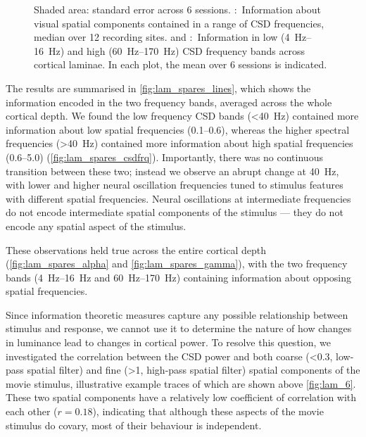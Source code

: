 \begin{figure}[htbp]
{Shaded area: standard error across \num{6} sessions.
\protect{}:~Information about visual spatial components contained in a range of \ac{CSD} frequencies, median over \num{12} recording sites.
\protect{} and \protect{}:~Information in low (\SIrange{4}{16}{Hz}) and high (\SIrange{60}{170}{Hz}) \ac{CSD} frequency bands across cortical laminae.
In each plot, the mean over \num{6} sessions is indicated.
}%
\label{fig:lam_spares}
%
\end{figure}

The results are summarised in \autoref{fig:lam_spares_lines}, which shows the information encoded in the two frequency bands, averaged across the whole cortical depth.
We found the low frequency \ac{CSD} bands (\SI{<40}{Hz}) contained more information about low spatial frequencies (\SIrange{0.1}{0.6}{\cpd}), whereas the higher spectral frequencies (\SI{>40}{Hz}) contained more information about high spatial frequencies (\SIrange{0.6}{5.0}{\cpd}) (\autoref{fig:lam_spares_csdfrq}).
Importantly, there was no continuous transition between these two; instead we observe an abrupt change at \SI{40}{Hz}, with lower and higher neural oscillation frequencies tuned to stimulus features with different spatial frequencies.
Neural oscillations at intermediate frequencies do not encode intermediate spatial components of the stimulus --- they do not encode any spatial aspect of the stimulus.

These observations held true across the entire cortical depth (\autoref{fig:lam_spares_alpha} and \autoref{fig:lam_spares_gamma}), with the two frequency bands (\SIrange{4}{16}{Hz} and \SIrange{60}{170}{Hz}) containing information about opposing spatial frequencies.

Since information theoretic measures capture any possible relationship between stimulus and response, we cannot use it to determine the nature of how changes in luminance lead to changes in cortical power.
To resolve this question, we investigated the correlation between the \ac{CSD} power and both coarse (\SI{<0.3}{\cpd}, low-pass spatial filter) and fine (\SI{>1}{\cpd}, high-pass spatial filter) spatial components of the movie stimulus, illustrative example traces of which are shown above \autoref{fig:lam_6}.
These two spatial components have a relatively low coefficient of correlation with each other ($r=0.18$), indicating that although these aspects of the movie stimulus do covary, most of their behaviour is independent.

